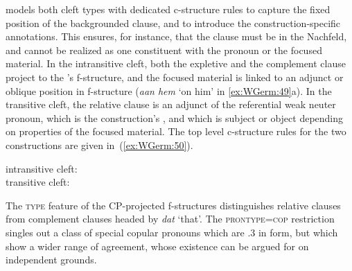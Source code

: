 \documentclass[output=paper,hidelinks]{langscibook}
\begin{document}
 models both cleft types with dedicated
c-structure rules to capture the fixed position of the backgrounded
clause, and to introduce the construc\-tion-specific annotations. This
ensures, for instance, that the clause must be in the Nachfeld, and cannot
be realized as one constituent with the pronoun or the focused
material. In the intransitive cleft, both the expletive and the complement
clause project to the \SUBJ{}'s f-structure, and the focused material is
linked to an adjunct or oblique position in f-structure (\textit{aan hem} `on him' in \ref{ex:WGerm:49}a). In the
transitive cleft, the relative clause is an adjunct of the referential
weak neuter pronoun, which is the construction's \TOPIC, and which is
subject or object depending on properties of the focused material. The
top level c-structure rules for the two constructions are given
in~(\ref{ex:WGerm:50}). 
%
\begin{exe}
  \ex\label{ex:WGerm:50}
  \begin{xlist}
    \ex intransitive cleft:\\
    \ex transitive cleft:\\
    
  \end{xlist}
\end{exe}
%
The \textsc{type} feature of the CP-projected f-structures
distinguishes relative clauses from complement clauses headed by
\textit{dat} `that'. The \textsc{prontype}=\textsc{cop} restriction
singles out a class of special copular pronouns which are \N.3\SG{}
in form, but which show a wider range of agreement, whose existence
can be argued for on independent grounds.
\end{document}
